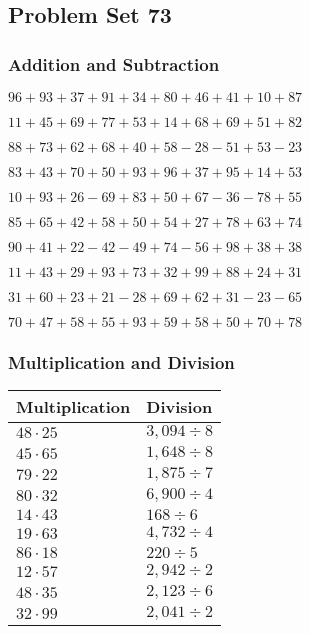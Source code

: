 \hypertarget{problem-set-73}{%
\subsection{Problem Set 73}\label{problem-set-73}}

\hypertarget{addition-and-subtraction}{%
\subsubsection{Addition and
Subtraction}\label{addition-and-subtraction}}

\(96+93+37+91+34+80+46+41+10+87\)

\(11+45+69+77+53+14+68+69+51+82\)

\(88+73+62+68+40+58-28-51+53-23\)

\(83+43+70+50+93+96+37+95+14+53\)

\(10+93+26-69+83+50+67-36-78+55\)

\(85+65+42+58+50+54+27+78+63+74\)

\(90+41+22-42-49+74-56+98+38+38\)

\(11+43+29+93+73+32+99+88+24+31\)

\(31+60+23+21-28+69+62+31-23-65\)

\(70+47+58+55+93+59+58+50+70+78\)

\hypertarget{multiplication-and-division}{%
\subsubsection{Multiplication and
Division}\label{multiplication-and-division}}

\begin{longtable}[]{@{}ll@{}}
\toprule
Multiplication & Division\tabularnewline
\midrule
\endhead
\(48\cdot25\) & \(3,094÷8\)\tabularnewline
\(45\cdot65\) & \(1,648÷8\)\tabularnewline
\(79\cdot22\) & \(1,875÷7\)\tabularnewline
\(80\cdot32\) & \(6,900÷4\)\tabularnewline
\(14\cdot43\) & \(168÷6\)\tabularnewline
\(19\cdot63\) & \(4,732÷4\)\tabularnewline
\(86\cdot18\) & \(220÷5\)\tabularnewline
\(12\cdot57\) & \(2,942÷2\)\tabularnewline
\(48\cdot35\) & \(2,123÷6\)\tabularnewline
\(32\cdot99\) & \(2,041÷2\)\tabularnewline
\bottomrule
\end{longtable}
